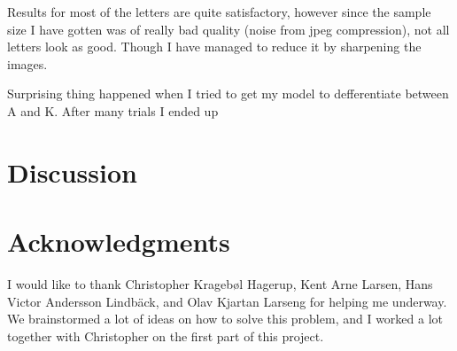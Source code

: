\documentclass[conference]{IEEEtran}
\begin{document}
Results for most of the letters are quite satisfactory, however since the sample size I have gotten was of really bad quality (noise from jpeg compression), not all letters look as good. Though I have managed to reduce it by sharpening the images.

Surprising thing happened when I tried to get my model to defferentiate between A and K. After many trials I ended up

\section{Discussion}


\section*{Acknowledgments}
I would like to thank Christopher Kragebøl Hagerup, Kent Arne Larsen, Hans Victor Andersson Lindbäck, and Olav Kjartan Larseng for helping me underway. We brainstormed a lot of ideas on how to solve this problem, and I worked a lot together with Christopher on the first part of this project.



\end{document}
